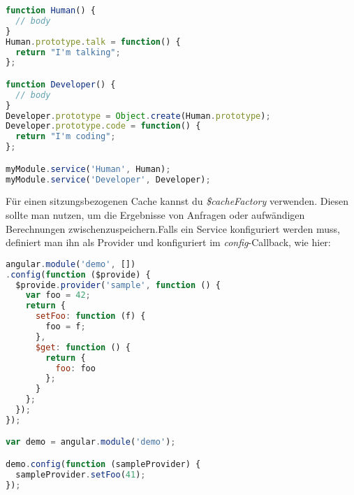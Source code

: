 \begin{lstlisting}[language=JavaScript]
function Human() {
  // body
}
Human.prototype.talk = function() {
  return "I'm talking";
};

function Developer() {
  // body
}
Developer.prototype = Object.create(Human.prototype);
Developer.prototype.code = function() {
  return "I'm coding";
};

myModule.service('Human', Human);
myModule.service('Developer', Developer);
\end{lstlisting}

Für einen sitzungsbezogenen Cache kannst du \textit{\$cacheFactory} verwenden. Diesen sollte man nutzen, um die Ergebnisse von Anfragen oder aufwändigen Berechnungen zwischenzuspeichern.Falls ein Service konfiguriert werden muss, definiert man ihn als Provider und konfiguriert im \textit{config}-Callback, wie hier:

\begin{lstlisting}[language=JavaScript]
angular.module('demo', [])
.config(function ($provide) {
  $provide.provider('sample', function () {
    var foo = 42;
    return {
      setFoo: function (f) {
        foo = f;
      },
      $get: function () {
        return {
          foo: foo
        };
      }
    };
  });
});

var demo = angular.module('demo');

demo.config(function (sampleProvider) {
  sampleProvider.setFoo(41);
});
\end{lstlisting}